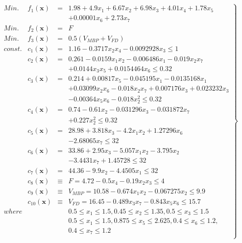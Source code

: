 \documentclass[../main/main]{subfiles}
\begin{document}
\begin{eqnarray}
\left.
\begin{array}{rccl}
Min. & f_1(\bm x) &=& 1.98 + 4.9 x_1 + 6.67x_2 + 6.98x_3 + 4.01x_4 + 1.78x_5 \\ 
        &                   &  & + 0.00001x_6 + 2.73x_7\\
Min. & f_2(\bm x) &=& F\\
Min. & f_3(\bm x) &=& 0.5(V_{MBP} + V_{FD})\\
const. &c_1(\bm x) &=& 1.16 - 0.3717x_2x_4 - 0.0092928x_3 \leq 1\\
          & c_2(\bm x) &=& 0.261 - 0.0159x_1x_2 - 0.006486x_1 - 0.019x_2x_7 \\
          &                    &  &+ 0.0144x_3x_5 + 0.0154464x_6 \leq 0.32\\
          & c_3(\bm x) &=& 0.214 + 0.00817x_5 - 0.045195x_1 - 0.0135168x_1 \\
          &                    &   &+ 0.03099x_2x_6 - 0.018x_2x_7 + 0.007176x_3 + 0.023232x_3 \\
          &                    &   &- 0.00364x_5x_6 - 0.018x_2^2 \leq 0.32\\
          & c_4(\bm x) &=& 0.74 - 0.61x_2 - 0.031296x_3 - 0.031872x_7 \\
          &                    &  &+ 0.227x_2^2 \leq 0.32\\
          & c_5(\bm x) &=& 28.98 + 3.818x_3 - 4.2x_1x_2 + 1.27296x_6 \\
          &                   &   &- 2.68065x_7 \leq 32\\
          & c_6(\bm x) &=& 33.86 + 2.95x_3 - 5.057x_1x_2 - 3.795x_2 \\
          &                   &   &- 3.4431x_7 + 1.45728 \leq32\\
          & c_7(\bm x) &=& 44.36 - 9.9x_2 - 4.4505x_1 \leq 32\\
          & c_8(\bm x) &\equiv & F = 4.72 - 0.5x_4 - 0.19x_2x_3 \leq4\\
          & c_9(\bm x) & \equiv & V_{MBP} = 10.58 - 0.674x_1x_2 - 0.067275x_2 \leq 9.9\\
          & c_{10}(\bm x) & \equiv & V_{FD} = 16.45 - 0.489x_3x_7 - 0.843x_5x_6 \leq 15.7\\
where & & & 0.5 \leq x_1 \leq 1.5, 0.45 \leq x_2 \leq 1.35, 0.5 \leq x_3 \leq 1.5\\
           & & & 0.5 \leq x_1 \leq 1.5, 0.875 \leq x_5 \leq 2.625, 0.4 \leq x_6 \leq 1.2,\\
           & & & 0.4 \leq x_7 \leq 1.2\\
\end{array}
\right\}
\label{car_eq}
\end{eqnarray}
\end{document}
